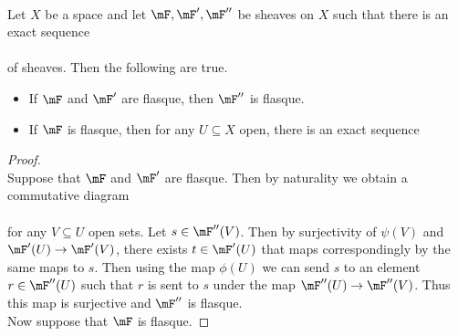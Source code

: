 \documentclass[a4paper]{article}
\begin{document}
\begin{lmm}{}{}\\
Let $X$ be a space and let $\mF,\mF',\mF''$ be sheaves on $X$ such that there is an exact sequence \\
\\
of sheaves. Then the following are true. 
\begin{itemize}
\item If $\mF$ and $\mF'$ are flasque, then $\mF''$ is flasque. 
\item If $\mF$ is flasque, then for any $U\subseteq X$ open, there is an exact sequence \\
\end{itemize}
\begin{proof}\\
Suppose that $\mF$ and $\mF'$ are flasque. Then by naturality we obtain a commutative diagram \\
\\
for any $V\subseteq U$ open sets. Let $s\in\mF''(V)$. Then by surjectivity of $\psi(V)$ and $\mF'(U)\to\mF'(V)$, there exists $t\in\mF'(U)$ that maps correspondingly by the same maps to $s$. Then using the map $\phi(U)$ we can send $s$ to an element $r\in\mF''(U)$ such that $r$ is sent to $s$ under the map $\mF''(U)\to\mF''(V)$. Thus this map is surjective and $\mF''$ is flasque. \\

Now suppose that $\mF$ is flasque. 
\end{proof}
\end{lmm}
\end{document}
